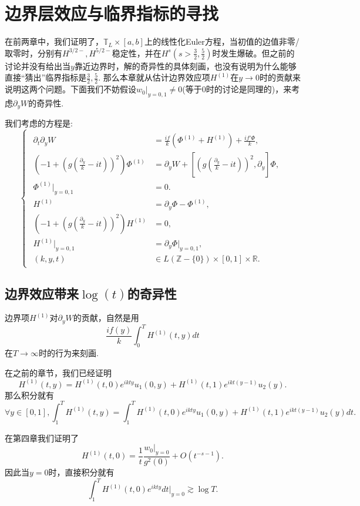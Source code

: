 ﻿\chapter{边界层效应与临界指标的寻找}

在前两章中，我们证明了，$\mathbb{T}_{L}\times [a,b]$上的线性化Euler方程，当初值的边值非零/取零时，分别有$H^{3/2-},H^{5/2-}$稳定性，并在$H^s(s>\frac{3}{2}, \frac{5}{2})$时发生爆破。但之前的讨论并没有给出当$y$靠近边界时，解的奇异性的具体刻画，也没有说明为什么能够直接“猜出”临界指标是$\frac{3}{2},\frac{5}{2}$. 那么本章就从估计边界效应项$H^{(1)}$在$y\rightarrow 0$时的贡献来说明这两个问题。下面我们不妨假设$w_0|_{y=0,1}\neq 0$(等于0时的讨论是同理的)，来考虑$\partial_y W$的奇异性.

我们考虑的方程是:
\begin{equation}
\begin{cases}
\begin{aligned}
\partial_t\partial_y W&=\frac{if}{k}(\Phi^{(1)}+H^{(1)})+\frac{if'\Phi}{k},\\
(-1+(g(\frac{\partial_y}{k}-it))^2)\Phi^{(1)}&=\partial_y W+[(g(\frac{\partial_y}{k}-it))^2,\partial_y]\Phi, \\
\Phi^{(1)}|_{y=0,1}&=0. \\
H^{(1)}&=\partial_y\Phi-\Phi^{(1)}, \\
(-1+(g(\frac{\partial_y}{k}-it))^2)H^{(1)}&=0, \\
H^{(1)}|_{y=0,1}&=\partial_y\Phi|_{y=0,1}, \\
(k,y,t)&\in L(\mathbb{Z}-\{0\})\times [0,1] \times\mathbb{R}.
\end{aligned}
\end{cases}
\end{equation}

\section{边界效应带来$\log(t)$的奇异性}
边界项$H^{(1)}$对$\partial_y W$的贡献，自然是用$$\frac{if(y)}{k}\int_0^T H^{(1)}(t,y)dt$$在$T\rightarrow \infty$时的行为来刻画. 

在之前的章节，我们已经证明$$H^{(1)}(t,y)=H^{(1)}(t,0)e^{ikty}u_1(0,y)+H^{(1)}(t,1)e^{ikt(y-1)}u_2(y).$$ 那么积分就有
\begin{equation}
\forall y\in [0,1], \int_1^{T}H^{(1)}(t,y)=\int_1^T H^{(1)}(t,0)e^{ikty}u_1(0,y)+H^{(1)} (t,1)e^{ikt(y-1)}u_2(y)dt.
\end{equation}

在第四章我们证明了$$H^{(1)}(t,0)=\frac{1}{t}\frac{w_0|_{y=0}}{g^2(0)}+O(t^{-s-1}).$$ 因此当$y=0$时，直接积分就有
$$\int_1^T H^{(1)}(t,0)e^{ikty}dt|_{y=0}\gtrsim\log T.$$

